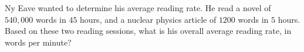 Ny Eave wanted to determine his average reading rate. He read a novel of $540{,}000$ words in $45$ hours, and a nuclear physics article of $1200$ words in $5$ hours. Based on these two reading sessions, what is his overall average reading rate, in words per minute?
